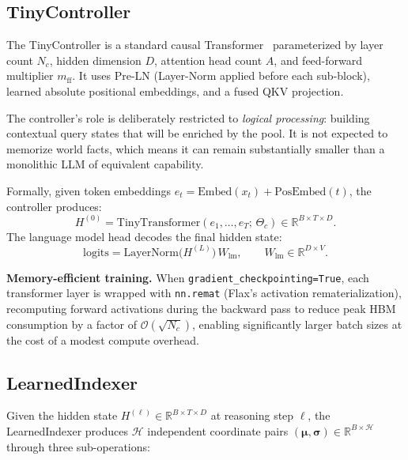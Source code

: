 \documentclass[11pt]{article}
\begin{document}
\subsection{TinyController}
\label{sec:controller}

The TinyController is a standard causal Transformer~\citep{vaswani2017attention}
parameterized by layer count $N_c$, hidden dimension $D$, attention head count
$A$, and feed-forward multiplier $m_{\mathrm{ff}}$.
It uses Pre-LN (Layer-Norm applied before each sub-block), learned absolute
positional embeddings, and a fused QKV projection.

The controller's role is deliberately restricted to \emph{logical processing}:
building contextual query states that will be enriched by the pool.
It is not expected to memorize world facts, which means it can remain
substantially smaller than a monolithic LLM of equivalent capability.

Formally, given token embeddings $e_t = \mathrm{Embed}(x_t) +
\mathrm{PosEmbed}(t)$, the controller produces:
\begin{equation}
  H^{(0)} = \mathrm{TinyTransformer}(e_1, \ldots, e_T;\, \Theta_c)
    \in \mathbb{R}^{B \times T \times D}.
\end{equation}
The language model head decodes the final hidden state:
\begin{equation}
  \mathrm{logits} = \mathrm{LayerNorm}\!\bigl(H^{(L)}\bigr)\,W_{\mathrm{lm}},
  \qquad W_{\mathrm{lm}} \in \mathbb{R}^{D \times V}.
\end{equation}

\textbf{Memory-efficient training.}
When \texttt{gradient\_checkpointing=True}, each transformer layer is wrapped
with \texttt{nn.remat} (Flax's activation rematerialization), recomputing
forward activations during the backward pass to reduce peak HBM consumption
by a factor of $\mathcal{O}(\sqrt{N_c})$, enabling significantly larger batch
sizes at the cost of a modest compute overhead.

\subsection{LearnedIndexer}
\label{sec:indexer}

Given the hidden state $H^{(\ell)} \in \mathbb{R}^{B \times T \times D}$ at
reasoning step $\ell$, the LearnedIndexer produces $\mathcal{H}$ independent
coordinate pairs $(\boldsymbol{\mu},\boldsymbol{\sigma}) \in \mathbb{R}^{B
\times \mathcal{H}}$ through three sub-operations:
\end{document}

